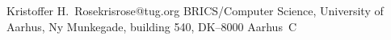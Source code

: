 \ifx\xyloaded\undefined  \fi
{}%
 {Kristoffer H.~Rose}{krisrose@tug.org}%
 {BRICS/Computer Science, University of Aarhus, Ny Munkegade, building 540,
 DK--8000 Aarhus~C}
\xyendinput
